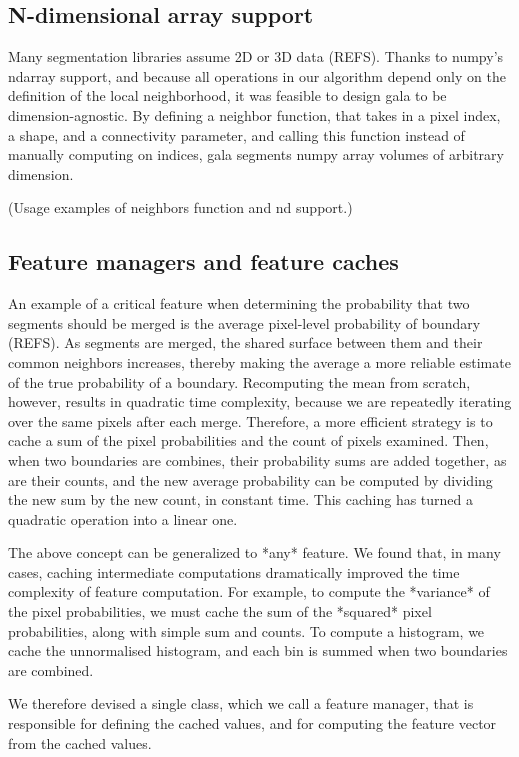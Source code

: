 \documentclass{frontiersSCNS} %
\begin{document}
\subsection{N-dimensional array support}
Many segmentation libraries assume 2D or 3D data (REFS).
Thanks to numpy's ndarray support, and because all operations in our algorithm depend only on the definition of the local neighborhood, it was feasible to design gala to be dimension-agnostic.
By defining a neighbor function, that takes in a pixel index, a shape, and a connectivity parameter, and calling this function instead of manually computing on indices, gala segments numpy array volumes of arbitrary dimension.

(Usage examples of neighbors function and nd support.)


\subsection{Feature managers and feature caches}

An example of a critical feature when determining the probability that two segments should be merged is the average pixel-level probability of boundary (REFS).
As segments are merged, the shared surface between them and their common neighbors increases, thereby making the average a more reliable estimate of the true probability of a boundary.
Recomputing the mean from scratch, however, results in quadratic time complexity, because we are repeatedly iterating over the same pixels after each merge.
Therefore, a more efficient strategy is to cache a sum of the pixel probabilities and the count of pixels examined.
Then, when two boundaries are combines, their probability sums are added together, as are their counts, and the new average probability can be computed by dividing the new sum by the new count, in constant time.
This caching has turned a quadratic operation into a linear one.

The above concept can be generalized to *any* feature.
We found that, in many cases, caching intermediate computations dramatically improved the time complexity of feature computation.
For example, to compute the *variance* of the pixel probabilities, we must cache the sum of the *squared* pixel probabilities, along with simple sum and counts.
To compute a histogram, we cache the unnormalised histogram, and each bin is summed when two boundaries are combined.

We therefore devised a single class, which we call a feature manager, that is responsible for defining the cached values, and for computing the feature vector from the cached values.
\end{document}
